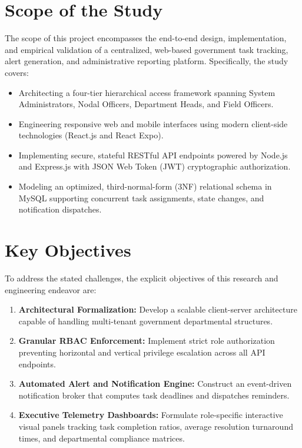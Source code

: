 \section{Scope of the Study}
\label{sec:scope_of_study}
The scope of this project encompasses the end-to-end design, implementation, and empirical validation of a centralized, web-based government task tracking, alert generation, and administrative reporting platform. Specifically, the study covers:
\begin{itemize}
    \item Architecting a four-tier hierarchical access framework spanning System Administrators, Nodal Officers, Department Heads, and Field Officers.
    \item Engineering responsive web and mobile interfaces using modern client-side technologies (React.js and React Expo).
    \item Implementing secure, stateful RESTful API endpoints powered by Node.js and Express.js with JSON Web Token (JWT) cryptographic authorization.
    \item Modeling an optimized, third-normal-form (3NF) relational schema in MySQL supporting concurrent task assignments, state changes, and notification dispatches.
\end{itemize}

\section{Key Objectives}
\label{sec:key_objectives}
To address the stated challenges, the explicit objectives of this research and engineering endeavor are:
\begin{enumerate}
    \item \textbf{Architectural Formalization:} Develop a scalable client-server architecture capable of handling multi-tenant government departmental structures.
    \item \textbf{Granular RBAC Enforcement:} Implement strict role authorization preventing horizontal and vertical privilege escalation across all API endpoints.
    \item \textbf{Automated Alert and Notification Engine:} Construct an event-driven notification broker that computes task deadlines and dispatches reminders.
    \item \textbf{Executive Telemetry Dashboards:} Formulate role-specific interactive visual panels tracking task completion ratios, average resolution turnaround times, and departmental compliance matrices.
\end{enumerate}
